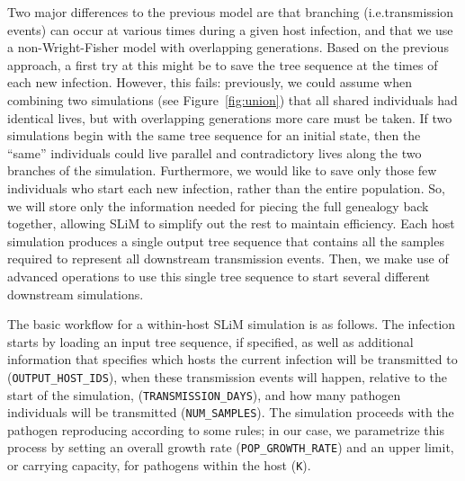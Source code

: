 \documentclass[12pt]{article}
\newcommand{\slim}[0]{\texttt{SLiM}\xspace}
\newcommand*{\ie}{i.e.\xcomma}
\begin{document}
Two major differences to the previous model are that branching (\ie transmission events) can occur at various times during a given host infection,
and that we use a non-Wright-Fisher model with overlapping generations.
Based on the previous approach,
a first try at this might be to save the tree sequence at the times of each new infection.
However, this fails:
previously, we could assume when combining two simulations
(see Figure~\ref{fig:union}) that all shared individuals had identical lives,
but with overlapping generations more care must be taken.
If two simulations begin with the same tree sequence for an initial state,
then the ``same'' individuals could live parallel and contradictory lives along the two branches of the simulation.
Furthermore, we would like to save only those few individuals who start each new infection,
rather than the entire population.
So, we will store only the information needed for piecing the full genealogy back together, allowing SLiM to simplify out the rest to maintain efficiency.
Each host simulation produces a single output tree sequence
that contains all the samples required to represent all downstream transmission events.
Then, we make use of advanced operations to use this single tree sequence
to start several different downstream simulations.

The basic workflow for a within-host SLiM simulation is as follows. The infection starts by loading an input tree sequence, if specified,
as well as additional information that specifies which hosts the current infection will be transmitted to (\verb|OUTPUT_HOST_IDS|),
when these transmission events will happen, relative to the start of the simulation, (\verb|TRANSMISSION_DAYS|),
and how many pathogen individuals will be transmitted (\verb|NUM_SAMPLES|).
The simulation proceeds with the pathogen reproducing according
to some rules; in our case, we parametrize this process by setting an overall growth rate (\verb|POP_GROWTH_RATE|)
and an upper limit, or carrying capacity, for pathogens within the host (\verb|K|).
\end{document}
